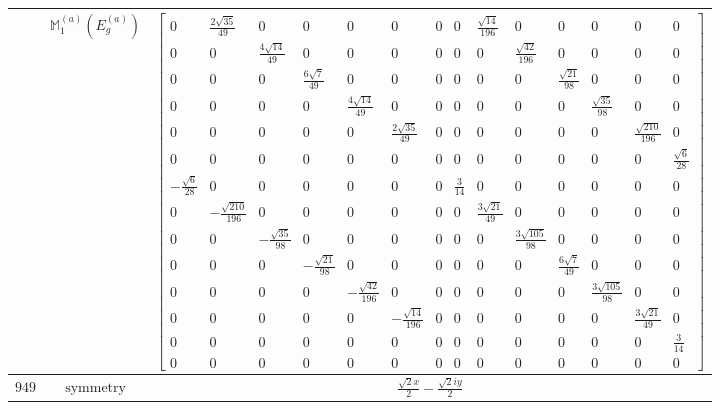 \documentclass[fleqn,8pt,landscape]{jsarticle}
\begin{document}
\begin{longtable}{ccc}
$  $ & $ \mathbb{M}_{1}^{(a)}(E_{g}^{(a)}) $ & $ \begin{bmatrix} 0 & \frac{2 \sqrt{35}}{49} & 0 & 0 & 0 & 0 & 0 & 0 & \frac{\sqrt{14}}{196} & 0 & 0 & 0 & 0 & 0 \\ 0 & 0 & \frac{4 \sqrt{14}}{49} & 0 & 0 & 0 & 0 & 0 & 0 & \frac{\sqrt{42}}{196} & 0 & 0 & 0 & 0 \\ 0 & 0 & 0 & \frac{6 \sqrt{7}}{49} & 0 & 0 & 0 & 0 & 0 & 0 & \frac{\sqrt{21}}{98} & 0 & 0 & 0 \\ 0 & 0 & 0 & 0 & \frac{4 \sqrt{14}}{49} & 0 & 0 & 0 & 0 & 0 & 0 & \frac{\sqrt{35}}{98} & 0 & 0 \\ 0 & 0 & 0 & 0 & 0 & \frac{2 \sqrt{35}}{49} & 0 & 0 & 0 & 0 & 0 & 0 & \frac{\sqrt{210}}{196} & 0 \\ 0 & 0 & 0 & 0 & 0 & 0 & 0 & 0 & 0 & 0 & 0 & 0 & 0 & \frac{\sqrt{6}}{28} \\ - \frac{\sqrt{6}}{28} & 0 & 0 & 0 & 0 & 0 & 0 & \frac{3}{14} & 0 & 0 & 0 & 0 & 0 & 0 \\ 0 & - \frac{\sqrt{210}}{196} & 0 & 0 & 0 & 0 & 0 & 0 & \frac{3 \sqrt{21}}{49} & 0 & 0 & 0 & 0 & 0 \\ 0 & 0 & - \frac{\sqrt{35}}{98} & 0 & 0 & 0 & 0 & 0 & 0 & \frac{3 \sqrt{105}}{98} & 0 & 0 & 0 & 0 \\ 0 & 0 & 0 & - \frac{\sqrt{21}}{98} & 0 & 0 & 0 & 0 & 0 & 0 & \frac{6 \sqrt{7}}{49} & 0 & 0 & 0 \\ 0 & 0 & 0 & 0 & - \frac{\sqrt{42}}{196} & 0 & 0 & 0 & 0 & 0 & 0 & \frac{3 \sqrt{105}}{98} & 0 & 0 \\ 0 & 0 & 0 & 0 & 0 & - \frac{\sqrt{14}}{196} & 0 & 0 & 0 & 0 & 0 & 0 & \frac{3 \sqrt{21}}{49} & 0 \\ 0 & 0 & 0 & 0 & 0 & 0 & 0 & 0 & 0 & 0 & 0 & 0 & 0 & \frac{3}{14} \\ 0 & 0 & 0 & 0 & 0 & 0 & 0 & 0 & 0 & 0 & 0 & 0 & 0 & 0 \end{bmatrix} $ \\ \hline
$ 949 $ & $ \text{symmetry} $ & $ \frac{\sqrt{2} x}{2} - \frac{\sqrt{2} i y}{2} $ \\

\end{longtable}
\end{document}

